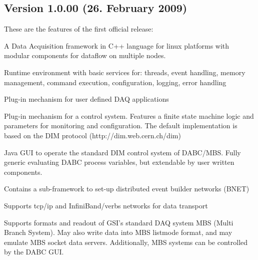 \subsection{Version 1.0.00 (26. February 2009)}
These are the features of the first official release:
\bnum
\item A Data Acquisition framework in C++ language for linux platforms
   with modular components for dataflow on multiple nodes.
   
\item Runtime environment with basic services for:
   threads, event handling, memory management, command execution, 
   configuration, logging, error handling

\item Plug-in mechanism for user defined DAQ applications

\item Plug-in mechanism for a control system. Features a finite state machine
   logic and parameters for monitoring and  configuration.
   The default implementation is based
   on the DIM protocol (http://dim.web.cern.ch/dim)

\item Java GUI to operate the standard DIM control system of DABC/MBS. 
   Fully generic evaluating DABC process variables, but extendable
   by user written components.

\item Contains a sub-framework to set-up distributed event builder networks (BNET) 
 
\item Supports tcp/ip and InfiniBand/verbs networks for data transport

\item Supports formats and readout of GSI's standard DAQ system MBS
   (Multi Branch System). May also write data into MBS listmode format,
   and may emulate MBS socket data servers.
   Additionally, MBS systems can be controlled by the DABC GUI.  
\enum

% 
% 
% 

